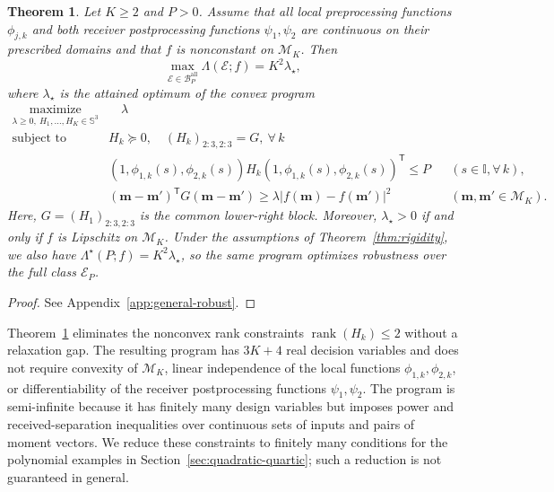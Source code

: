 \documentclass[journal,12pt,onecolumn,draftclsnofoot]{IEEEtran}
\newtheorem{theorem}{Theorem}
\newcommand{\enc}{\mathscr{E}}\newcommand{\dec}{\mathscr{D}}\newcommand{\R}{\mathbb R}\newcommand{\C}{\mathbb C}
\newcommand{\T}{\mathsf T}\newcommand{\suc}{\succeq}
\begin{document}
\begin{theorem}
\label{thm:sdp}\label{thm:general-secant}
Let $K\ge2$ and $P>0$. Assume that all local preprocessing functions $\phi_{j,k}$ and both receiver postprocessing functions
$\psi_1,\psi_2$ are continuous on their prescribed domains and that
$f$ is nonconstant on $\mathcal M_K$. Then
$$
 \max_{\enc\in{ \mathcal B_P^{\mathrm{all}}}}\Lambda(\enc;f)
 =K^2\lambda_\star,
$$
where $\lambda_\star$ is the attained optimum of the convex program
\begin{subequations}
\label{eq:general-secant-program}
\begin{align}
\nonumber
 \underset{\lambda\ge0,\ H_1,\ldots,H_K\in\mathbb S^3}
 {\operatorname{maximize}}
 &\quad \lambda\\ \label{eq:general-secant-program(a)}
 \text{subject to}\quad
 &H_k\succeq0,\quad (H_k)_{2:3,2:3}=G,~ \forall\,k
       \\ \label{eq:general-secant-program(b)}
 &(1,\phi_{1,k}(s),\phi_{2,k}(s))H_k
       (1,\phi_{1,k}(s),\phi_{2,k}(s))^\T\le P
       &&(s\in\mathbb I,\forall\,k),\\ \label{eq:general-secant-program(c)}
 &(\boldsymbol m-\boldsymbol m')^\T
   G(\boldsymbol m-\boldsymbol m')
 \ge\lambda |f(\boldsymbol m)-f(\boldsymbol m')|^2
       &&(\boldsymbol m,\boldsymbol m'\in\mathcal M_K).
\end{align}
\end{subequations}
Here, $G=(H_1)_{2:3,2:3}$ is the common lower-right block.
Moreover, $\lambda_\star>0$ if and only if $f$ is Lipschitz
on $\mathcal M_K$. 
Under the assumptions of
Theorem~\ref{thm:rigidity}, we also have
$\Lambda^\star(P;f)=K^2\lambda_\star$, so the same program
optimizes robustness over the full class $\mathcal E_P$.
\end{theorem}
\begin{proof}
See Appendix~\ref{app:general-robust}.
\end{proof}




Theorem~\ref{thm:sdp} eliminates the nonconvex rank constraints
$\operatorname{rank}(H_k)\le2$ without a relaxation gap. The resulting
program has $3K+4$ real decision variables and does not require
convexity of $\mathcal M_K$, linear independence of the local
functions $\phi_{1,k},\phi_{2,k}$, or differentiability of the receiver postprocessing functions $\psi_1,\psi_2$.
The program is semi-infinite because it has finitely many design variables but imposes power and received-separation inequalities over continuous sets of inputs and pairs of moment vectors. We reduce these constraints to finitely many conditions for the polynomial examples in Section~\ref{sec:quadratic-quartic}; such a reduction is not guaranteed in general.
\end{document}
